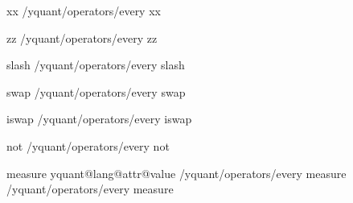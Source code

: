 \yquant@langhelper@declare@command%
   {xx}%
   \yquant@register@get@multiassingle%
   {%
      \yquant@prepare%
         {}%
         {/yquant/operators/every xx}%
   }

\yquant@langhelper@declare@command@uncontrolled%
   {zz}%
   \yquant@register@get@multiassingle%
   {%
      \yquant@prepare%
         {}%
         {/yquant/operators/every zz}%
   }

\yquant@langhelper@declare@command@uncontrolled%
   {slash}%
   {}%
   {%
      \preto{}%
      \yquant@prepare%
         {}%
         {/yquant/operators/every slash}%
   }

\yquant@langhelper@declare@command%
   {swap}%
   \yquant@register@get@multiassingle
   {%
      \yquant@prepare%
         {}%
         {/yquant/operators/every swap}%
   }

\yquant@langhelper@declare@command%
   {iswap}%
   \yquant@register@get@multiassingle
   {%
      \yquant@prepare%
         {}%
         {/yquant/operators/every iswap}%
   }

\yquant@langhelper@declare@command%
   {not}%
   {}%
   {%
      \yquant@prepare%
         {}%
         {/yquant/operators/every not}%
   }

\yquant@langhelper@declare@command@uncontrolled%
   {measure}%
   \yquant@register@get@allowmultitrue%
   {%
      \ifdefined\yquant@lang@attr@type%
         \yquant@register@type@fromstring\yquant@lang@attr@type\yquant@circuit@settype@to%
      \else%
         \let\yquant@circuit@settype@to=\yquant@register@types@cbit%
      \fi%
      \let\yquant@prepare@callback@prepare=\yquant@circuit@settype@prepare%
      \let\yquant@prepare@callback@draw=\yquant@circuit@settype%
      \unless\ifcsname yquant@lang@attr@value\endcsname%
         \let\yquant@lang@attr@value=\empty%
      \fi%
      \ifdefined\yquant@lang@attr@directcontrol%
         \expandafter\yquant@prepare@injection%
            \expandafter{\yquant@lang@attr@value}%
            {/yquant/operators/every measure}%
      \else%
         \expandafter\yquant@prepare%
            \expandafter{\yquant@lang@attr@value}%
            {/yquant/operators/every measure}%
      \fi%
   }

